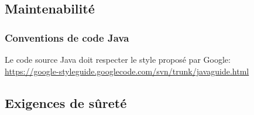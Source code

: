 
\subsection{Maintenabilité}
	

\subsubsection{Conventions de code Java}

\begin{requirement}
	Le code source Java doit respecter le style proposé par Google:\\
\url{https://google-styleguide.googlecode.com/svn/trunk/javaguide.html}
\end{requirement}



	\subsection{Exigences de sûreté}

